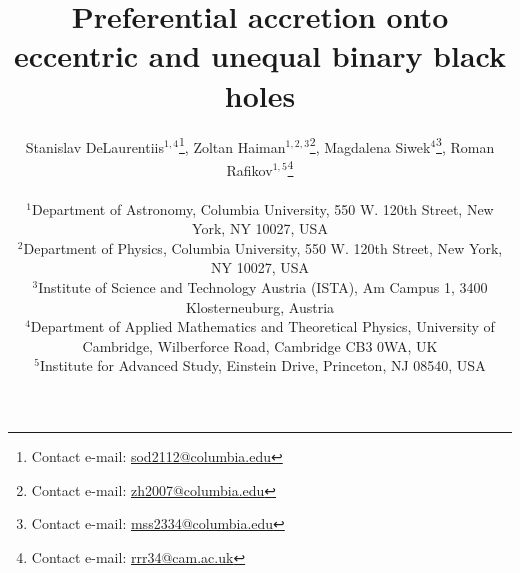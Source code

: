 \documentclass[fleqn,usenatbib]{mnras}
\begin{document}
\author[S. DeLaurentiis et al.]{
Stanislav DeLaurentiis$^{1,4}$\thanks{Contact e-mail: \href{mailto:sod2112@columbia.edu}{sod2112@columbia.edu}}, Zoltan Haiman$^{1,2,3}$\thanks{Contact e-mail: \href{mailto:zh2007@columbia.edu}{zh2007@columbia.edu}}, Magdalena Siwek$^{4}$\thanks{Contact e-mail: \href{mailto:mss2334@columbia.edu}{mss2334@columbia.edu}}, Roman Rafikov$^{1,5}$\thanks{Contact e-mail: \href{mailto:rrr34@cam.ac.uk}{rrr34@cam.ac.uk}} \\
\\
$^{1}$Department of Astronomy, Columbia University, 550 W. 120th Street, New York, NY 10027, USA\\
$^{2}$Department of Physics, Columbia University, 550 W. 120th Street, New York, NY 10027, USA\\
$^{3}$Institute of Science and Technology Austria (ISTA), Am Campus 1, 3400 Klosterneuburg, Austria\\
$^{4}$Department of Applied Mathematics and Theoretical Physics, University of Cambridge, Wilberforce Road, Cambridge CB3 0WA, UK\\
$^{5}$Institute for Advanced Study, Einstein Drive, Princeton, NJ 08540, USA
}


\title{Preferential accretion onto eccentric and unequal binary black holes}


\date{}


\label{firstpage}
\pagerange{\pageref{firstpage}--\pageref{lastpage}}
\maketitle
\end{document}
